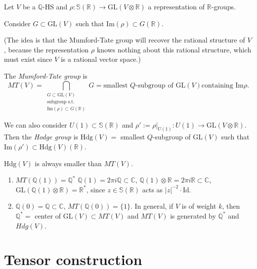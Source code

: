 \noindent
Let $V$ be a $\mathbb{Q}$-HS
and $\rho:\mathbb{S}(\mathbb{R}) \to
\text{GL}(V \otimes \mathbb{R})$
a representation of $\mathbb{R}$-groups.

Consider $G \subset \text{GL}(V)$ such that
$\text{Im}(\rho) \subset G(\mathbb{R})$.

(The idea is that the Mumford-Tate group
will recover the rational structure of $V$,
because the representation $\rho$ knows
nothing
about this rational structure, which must
exist
since $V$ is a rational vector space.)

\begin{definition}
\label{definition-mumford-tate-group}
The {\it Mumford-Tate group} is
$$
MT(V)=\bigcap_{\substack{G \subset
\text{GL}(V) \\
\text{subgroup s.t.}\\
\text{Im}(\rho) \subset G(\mathbb{R})}}G
=
\text{smallest $Q$-subgroup of $\text{GL}(V)$
containing $\text{Im}\rho$}.
$$
\end{definition}

\begin{remark}
\label{remark-Hodge-group}
We can also consider $U(1) \subset
\mathbb{S}(\mathbb{R})$
and $\rho':=\rho|_{U(1)}: U(1) \to
\text{GL}(V \otimes \mathbb{R})$.
Then the {\it Hodge group} is
$\text{Hdg}(V)=$
smallest $Q$-subgroup of $\text{GL}(V)$ such
that
$\text{Im}(\rho')\subset
\text{Hdg}(V)(\mathbb{R})$.

$\text{Hdg}(V)$
is always smaller than $MT(V)$.
\end{remark}

\begin{example}
\label{example-mumford-tate-group}
\begin{enumerate}
\item $MT(\mathbb{Q}(1))=\mathbb{Q}^*$
$\mathbb{Q}(1)=2\pi i \mathbb{Q} \subset
\mathbb{C}$,
$\mathbb{Q}(1) \otimes \mathbb{R}=2\pi
i\mathbb{R}\subset \mathbb{C}$,
$\text{GL}(\mathbb{Q}(1)\otimes
\mathbb{R})=\mathbb{R}^*$,
since $z \in \mathbb{S}(\mathbb{R})$ acts as
$|z|^{-2}\cdot \text{Id}$.

\item $\mathbb{Q}(0)=\mathbb{Q} \subset
\mathbb{C}$,
$MT(\mathbb{Q}(0)) = \{1\}$.
In general, if $V$ is of weight $k$,
then $\mathbb{Q}^* =$ center of
$\text{GL}(V)\subset MT(V)$
and $MT(V)$ is generated by  $\mathbb{Q}^*$
and $Hdg(V)$.
\end{enumerate}
\end{example}


\section{Tensor construction}
\label{section-tensor-construction}

